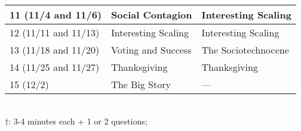 {\begin{tabular}{|p{}|p{}|p{}|}
    \hline
    11 (11/4 and 11/6)      & Social Contagion &  Interesting Scaling \\
    \hline
    12 (11/11 and 11/13)    & Interesting Scaling & Interesting Scaling \\
    \hline                                                                        
    13 (11/18 and 11/20)    & Voting and Success & The Sociotechnocene \\
    \hline
    14 (11/25 and 11/27)    & Thanksgiving  & Thanksgiving \\
    \hline
    15 (12/2)               & The Big Story & --- \\
    \hline
  \end{tabular}\\
  \smallskip
  $\dagger$: 3-4 minutes each + 1 or 2 questions;



}

\newcommand{\importantdates}{
  \begin{enumerate}
  \item Classes run from Tuesday, August 27 to Tuesday, December 3.
  \item Add/Drop, Audit, Pass/No Pass deadline---Monday, September 9.
  \item Last day to withdraw---Monday, October 28 (Sadness!).
  \item Reading and Exam period---Thursday, December 5 to Friday, December 13.
  \end{enumerate}
}

